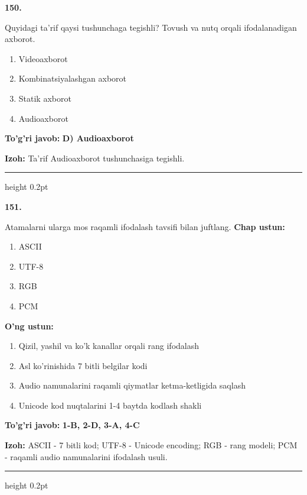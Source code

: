 \documentclass[10pt,a4paper,oneside]{article}
\begin{document}
\noindent\textbf{\color{ink}150.}
\par
Quyidagi ta'rif qaysi tushunchaga tegishli? Tovush va nutq orqali ifodalanadigan axborot.
\begin{enumerate}[label=\Alph*),leftmargin=9mm]
\item Videoaxborot
\item Kombinatsiyalashgan axborot
\item Statik axborot
\item Audioaxborot
\end{enumerate}
\begin{tcolorbox}[enhanced,breakable,colback=teal!4,colframe=teal!50!black,boxrule=0.5pt,arc=1.1mm,left=3mm,right=3mm,top=1.7mm,bottom=1.7mm,before skip=2mm,after skip=2mm]
\textbf{\color{teal}To'g'ri javob:} \textbf{D) Audioaxborot}
\par\smallskip
\textbf{Izoh:} Ta'rif Audioaxborot tushunchasiga tegishli.
\end{tcolorbox}
\vspace{2mm}\hrule height 0.2pt \vspace{3mm}

\noindent\textbf{\color{ink}151.}
\par
Atamalarni ularga mos raqamli ifodalash tavsifi bilan juftlang.
\textbf{\footnotesize Chap ustun:}
\begin{enumerate}[label=\arabic*),leftmargin=9mm]
\item ASCII
\item UTF-8
\item RGB
\item PCM
\end{enumerate}
\textbf{\footnotesize O'ng ustun:}
\begin{enumerate}[label=\Alph*),leftmargin=9mm]
\item Qizil, yashil va ko'k kanallar orqali rang ifodalash
\item Asl ko'rinishida 7 bitli belgilar kodi
\item Audio namunalarini raqamli qiymatlar ketma-ketligida saqlash
\item Unicode kod nuqtalarini 1-4 baytda kodlash shakli
\end{enumerate}
\begin{tcolorbox}[enhanced,breakable,colback=teal!4,colframe=teal!50!black,boxrule=0.5pt,arc=1.1mm,left=3mm,right=3mm,top=1.7mm,bottom=1.7mm,before skip=2mm,after skip=2mm]
\textbf{\color{teal}To'g'ri javob:} \textbf{1-B, 2-D, 3-A, 4-C}
\par\smallskip
\textbf{Izoh:} ASCII - 7 bitli kod; UTF-8 - Unicode encoding; RGB - rang modeli; PCM - raqamli audio namunalarini ifodalash usuli.
\end{tcolorbox}
\vspace{2mm}\hrule height 0.2pt \vspace{3mm}
\end{document}
